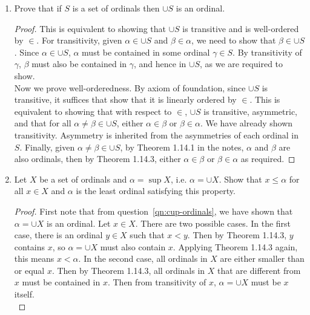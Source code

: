 \documentclass{article}
\begin{document}
\begin{enumerate}
    \begin{proof}
      No, the composition is not an order relation because it is symmetric.
      Consider the counter example $B_1=\{(x,y)\}$ and $B_2=\{(y,x)\}$.
      Then $B_1\circ B_2=\{(x,x)\}$, which is not an asymmetric relation.
    \end{proof}

  \item Prove that if $S$ is a set of ordinals then $\cup S$ is an ordinal.
    \label{qn:cup-ordinals}
    \begin{proof}
      This is equivalent to showing that $\cup S$ is transitive and is
      well-ordered by $\in$. For transitivity, given $\alpha\in\cup S$ and
      $\beta\in\alpha$, we need to show that $\beta\in\cup S$. Since
      $\alpha\in\cup S$, $\alpha$ must be contained in some ordinal
      $\gamma\in S$. By transitivity of $\gamma$, $\beta$ must also be
      contained in $\gamma$, and hence in $\cup S$, as we are required to
      show. \\

      Now we prove well-orderedness. By axiom of foundation, since $\cup S$
      is transitive, it suffices that show that it is linearly ordered by
      $\in$. This is equivalent to showing that with respect to $\in$,
      $\cup S$ is transitive, asymmetric, and that for all
      $\alpha\neq\beta\in\cup S$, either $\alpha\in\beta$ or
      $\beta\in\alpha$. We have already shown transitivity. Asymmetry is
      inherited from the asymmetries of each ordinal in $S$. Finally, given
      $\alpha\neq\beta\in\cup S$, by Theorem 1.14.1 in the notes, $\alpha$
      and $\beta$ are also ordinals, then by Theorem 1.14.3, either
      $\alpha\in\beta$ or $\beta\in\alpha$ as required.
    \end{proof}

  \item Let $X$ be a set of ordinals and $\alpha=\sup X$, i.e. $\alpha=\cup
    X$. Show that $x\leq\alpha$ for all $x\in X$ and $\alpha$ is the least
    ordinal satisfying this property.

    \begin{proof}
      First note that from question~\ref{qn:cup-ordinals}, we have shown
      that $\alpha=\cup X$ is an ordinal. Let $x\in X$. There are two
      possible cases. In the first case, there is an ordinal $y\in X$ such
      that $x<y$. Then by Theorem 1.14.3, $y$ contains $x$, so $\alpha=\cup
      X$ must also contain $x$. Applying Theorem 1.14.3 again, this means
      $x<\alpha$. In the second case, all ordinals in $X$ are either
      smaller than or equal $x$. Then by Theorem 1.14.3, all ordinals in
      $X$ that are different from $x$ must be contained in $x$. Then from
      transitivity of $x$, $\alpha=\cup X$ must be $x$ itself. \\


\end{proof}
\end{enumerate}
\end{document}
